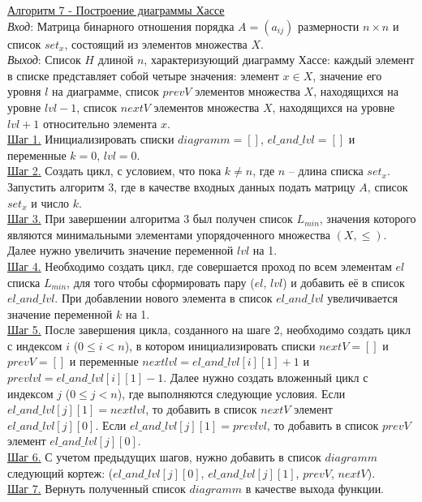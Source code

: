 \documentclass[bachelor, och, labwork]{shiza}
\begin{document}
        \underline{Алгоритм 7 - Построение диаграммы Хассе}\\
            \textit{Вход}: Матрица бинарного отношения порядка $A = (a_{ij})$ размерности $n \times n$ и список $set_x$, 
            состоящий из элементов множества $X$.\\
            \textit{Выход}: Список $H$ длиной $n$, характеризующий диаграмму Хассе: каждый элемент в списке представляет
            собой четыре значения: элемент $x \in X$, значение его уровня $l$ на диаграмме, список $prevV$ элементов множества
            $X$, находящихся на уровне $lvl - 1$, список $nextV$ элементов множества $X$, находящихся на уровне $lvl + 1$ относительно
            элемента $x$. \\
            \underline{Шаг 1.} Инициализировать списки $diagramm = []$, $el\_and\_lvl = []$ и переменные $k = 0$, $lvl = 0$.\\
            \underline{Шаг 2.} Создать цикл, с условием, что пока $k \neq n$, где $n$ -- длина списка $set_x$. Запустить алгоритм 3, где
            в качестве входных данных подать матрицу $A$, список $set_x$ и число $k$.\\
            \underline{Шаг 3.} При завершении алгоритма 3 был получен список $L_{min}$, значения которого являются
            минимальными элементами упорядоченного множества $(X, \leq)$. Далее нужно увеличить значение переменной $lvl$ на 1. \\    
            \underline{Шаг 4.} Необходимо создать цикл, где совершается проход по всем элементам $el$ списка $L_{min}$, для того чтобы
            сформировать пару ($el$, $lvl$) и добавить её в список $el\_and\_lvl$. При добавлении нового элемента в список $el\_and\_lvl$
            увеличивается значение переменной $k$ на 1.\\
            \underline{Шаг 5.} После завершения цикла, созданного на шаге 2, необходимо создать цикл с индексом $i$ ($0 \leq i < n$), в
            котором инициализировать списки $nextV = []$ и $prevV = []$ и переменные $nextlvl = el\_and\_lvl[i][1] + 1$ 
            и $prevlvl = el\_and\_lvl[i][1] - 1$. Далее нужно создать вложенный цикл с индексом $j$ ($0 \leq j < n$), где выполняются следующие
            условия. Если $el\_and\_lvl[j][1] = nextlvl$, то добавить в список $nextV$ элемент $el\_and\_lvl[j][0]$. Если 
            $el\_and\_lvl[j][1] = prevlvl$, то добавить в список $prevV$ элемент $el\_and\_lvl[j][0]$. \\
            \underline{Шаг 6.} С учетом предыдущих шагов, нужно добавить в список $diagramm$ следующий кортеж: ($el\_and\_lvl[j][0]$, $el\_and\_lvl[j][1]$,
            $prevV$, $nextV$). \\
            \underline{Шаг 7.} Вернуть полученный список $diagramm$ в качестве выхода функции.\\
\end{document}
